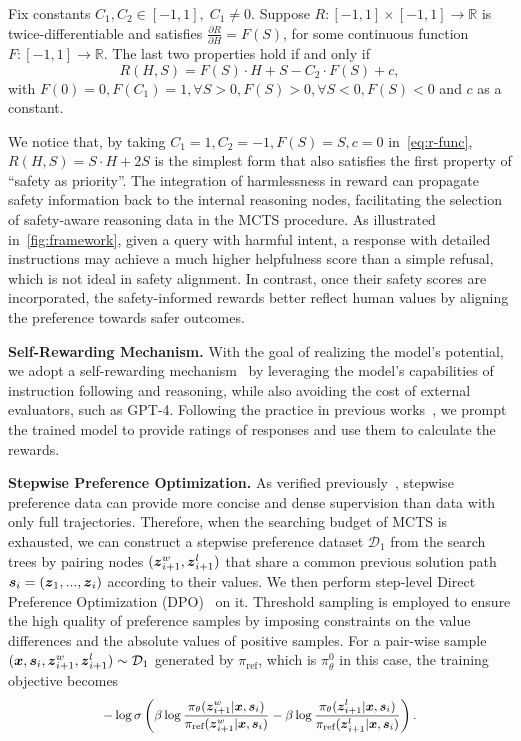 \begin{theorem}
\label{theorem}
    Fix constants $C_1, C_2\in [-1,1],\;C_1\ne0$. Suppose $R:[-1,1]\times[-1,1]\rightarrow \mathbb{R}$ is twice-differentiable and satisfies $\frac{\partial R}{\partial H}=F(S)$, for some continuous function $F: [-1,1]\rightarrow \mathbb{R}$. The last two properties hold if and only if
    \begin{equation}
    R(H,S)=F(S)\cdot H+S - C_2 \cdot F(S)+c,       
    \label{eq:r-func}
    \end{equation} with $F(0)=0, F(C_1)=1, \forall S>0, F(S)>0, \forall S<0, F(S)<0$ and $c$ as a constant.
\end{theorem}

We notice that, by taking $C_1=1, C_2=-1, F(S)=S, c=0$ in~\cref{eq:r-func}, $R(H,S)=S\cdot H + 2S$ is the simplest form that also satisfies the first property of ``safety as priority''. 
The integration of harmlessness in reward can propagate safety information back to the internal reasoning nodes, facilitating the selection of safety-aware reasoning data in the MCTS procedure. As illustrated in~\cref{fig:framework}, given a query with harmful intent, a response with detailed instructions may achieve a much higher helpfulness score than a simple refusal, which is not ideal in safety alignment. In contrast, once their safety scores are incorporated, the safety-informed rewards better reflect human values by aligning the preference towards safer outcomes.

\textbf{Self-Rewarding Mechanism.} With the goal of realizing the model's potential, we adopt a self-rewarding mechanism~\cite{yuanself} by leveraging the model's capabilities of instruction following and reasoning, while also avoiding the cost of external evaluators, such as GPT-4. Following the practice in previous works~\cite{yuanself,zhang2024chain}, we prompt the trained model to provide ratings of responses and use them to calculate the rewards.

\textbf{Stepwise Preference Optimization.} As verified previously~\cite{zhang2024chain}, stepwise preference data can provide more concise and dense supervision than data with only full trajectories. Therefore, when the searching budget of MCTS is exhausted, we can construct a stepwise preference dataset $\mathcal{D}_1$ from the search trees by pairing nodes $(\boldsymbol{z}_{i+1}^{w}, \boldsymbol{z}_{i+1}^{l})$ that share a common previous solution path $\boldsymbol{s}_i=(\boldsymbol{z}_1,...,\boldsymbol{z}_{i})$ according to their values. We then perform step-level Direct Preference Optimization (DPO)~\cite{rafailov2024direct} on it. Threshold sampling is employed to ensure the high quality of preference samples by imposing constraints on the value differences and the absolute values of positive samples. For a pair-wise sample $(\boldsymbol{x},\boldsymbol{s}_i,\boldsymbol{z}_{i+1}^w,\boldsymbol{z}_{i+1}^l)\sim\mathcal{D}_1$ generated by $\pi_\text{ref}$, which is $\pi_\theta^0$ in this case, the training objective becomes 
\begin{equation}\small
-\log\sigma\left(\beta\log\frac{\pi_{\theta}(\boldsymbol{z}_{i+1}^w|\boldsymbol{x},\boldsymbol{s}_i)}{\pi_{\text{ref}}(\boldsymbol{z}_{i+1}^w|\boldsymbol{x},\boldsymbol{s}_i)}-\beta\log\frac{\pi_{\theta}(\boldsymbol{z}_{i+1}^l|\boldsymbol{x},\boldsymbol{s}_i)}{\pi_{\text{ref}}(\boldsymbol{z}_{i+1}^l|\boldsymbol{x},\boldsymbol{s}_i)}\right).
\end{equation}


